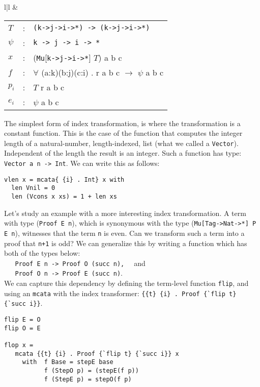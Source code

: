 {{\begin{tabular}{l|l}
&

\begin{minipage}[l]{.45\linewidth}
\begin{tabular}{lcl}
$T$ & : & \verb+(k->j->i->*) -> (k->j->i->*)+ \\
$\psi$ & : & \verb+k -> j -> i -> *+               \\ 
$x$ & : & (\verb+Mu+[\verb+k->j->i->*+] $T$) a b c        \\
$f$ & : & $\forall$ (a:k)(b:j)(c:i) . r a b c $\to$ $\psi$ a b c \\
$p_{i}$ & : & $T$ r a b c            \\
$e_{i}$ & : & $\psi$ a b c   \\
\end{tabular}
\end{minipage}
\end{tabular}
}  
\vspace*{0.05in}

The simplest form of index transformation, is where the transformation
is a constant function. This is the case of the function that computes
the integer length of a natural-number, length-indexed, list
(what we called a \verb+Vector+). Independent of the length the result
is an integer. Such a function has type: \verb+Vector a n -> Int+.
We can write this as follows:

{\small
\begin{verbatim}           
vlen x = mcata{ {i} . Int} x with
  len Vnil = 0
  len (Vcons x xs) = 1 + len xs
\end{verbatim}}


Let's study an example with a more interesting index transformation.
A term with type (\verb+Proof E n+), which is synonymous with the type 
(\verb+Mu[Tag->Nat->*] P E n+),  
witnesses that the term \verb+n+ is even. Can we transform such a term
into a proof that \verb!n+1! is odd? We can generalize this
by writing a function which has both of the types below:\\
\verb+   Proof E n -> Proof O (succ n),  + and \\
\verb+   Proof O n -> Proof E (succ n)+. \\
We can capture this dependency
by defining the term-level function \verb+flip+, and using an \verb+mcata+
with the index transformer: \verb+{{t} {i} . Proof {`flip t} {`succ i}}+.

{\small
\begin{verbatim}
flip E = O
flip O = E

flop x = 
   mcata {{t} {i} . Proof {`flip t} {`succ i}} x    
     with  f Base = stepE base
           f (StepO p) = (stepE(f p))
           f (StepE p) = stepO(f p)
\end{verbatim}}


}
